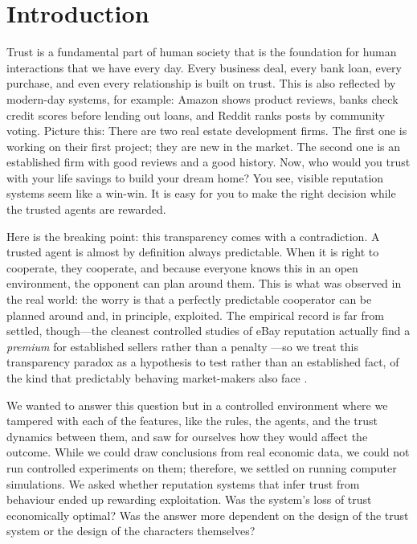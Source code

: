 \documentclass[10pt,twocolumn,letterpaper]{article}
\begin{document}
\thispagestyle{firstpage}

\section{Introduction}

Trust is a fundamental part of human society that is the
foundation for human interactions that we have every day. Every
business deal, every bank loan, every purchase, and even every
relationship is built on trust. This is also reflected by
modern-day systems, for example: Amazon shows product reviews,
banks check credit scores before lending out loans, and Reddit
ranks posts by community voting. Picture this: There are two real
estate development firms. The first one is working on their first
project; they are new in the market. The second one is an
established firm with good reviews and a good history. Now, who
would you trust with your life savings to build your dream home?
You see, visible reputation systems seem like a win-win. It is
easy for you to make the right decision while the trusted agents
are rewarded.

Here is the breaking point: this transparency comes with a
contradiction. A trusted agent is almost by definition always
predictable. When it is right to cooperate, they cooperate, and
because everyone knows this in an open environment, the opponent
can plan around them. This is what was observed in the real
world: the worry is that a perfectly predictable cooperator can be
planned around and, in principle, exploited. The empirical record is
far from settled, though---the cleanest controlled studies of eBay
reputation actually find a \emph{premium} for established sellers
rather than a penalty \citep{resnick2002trust,bolton2004effective}---so
we treat this transparency paradox as a hypothesis to test rather
than an established fact, of the kind that predictably behaving
market-makers also face \citep{glosten1985bid}.

We wanted to answer this question but in a controlled environment
where we tampered with each of the features, like the rules, the
agents, and the trust dynamics between them, and saw for ourselves
how they would affect the outcome. While we could draw conclusions
from real economic data, we could not run controlled experiments
on them; therefore, we settled on running computer simulations. We
asked whether reputation systems that infer trust from behaviour
ended up rewarding exploitation. Was the system's loss of trust
economically optimal? Was the answer more dependent on the design
of the trust system or the design of the characters themselves?
\end{document}
